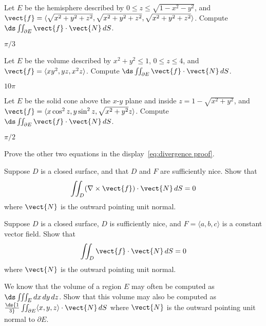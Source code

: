 \begin{enumialphparenastyle}
\begin{ex}
Let $E$ be the hemisphere described by 
$0\le z\le \sqrt{1-x^2-y^2}$, and 
$\vect{f}= \langle \sqrt{x^2+y^2+z^2},\sqrt{x^2+y^2+z^2},
\sqrt{x^2+y^2+z^2}\rangle$. Compute
$\ds\iint_{\partial E} \vect{f}\cdot \vect{N}\,dS$.
\begin{sol}
	$\pi/3$
\end{sol}
\end{ex}

\begin{ex}
Let $E$ be the volume described by 
$x^2+y^2\le1$, $0\le z\le4$, and 
$\vect{f}= \langle xy^2,yz,x^2z\rangle$. Compute
$\ds\iint_{\partial E} \vect{f}\cdot \vect{N}\,dS$.
\begin{sol}
	$10\pi$
\end{sol}
\end{ex}

\begin{ex}
Let $E$ be the solid cone above the $x$-$y$ plane and
inside $z=1-\sqrt{x^2+y^2}$, and 
$\vect{f}= \langle x\cos^2 z,y\sin^2z,\sqrt{x^2+y^2}z\rangle$. Compute
$\ds\iint_{\partial E} \vect{f}\cdot \vect{N}\,dS$.
\begin{sol}
	$\pi/2$
\end{sol}
\end{ex}

\begin{ex}
Prove the other two equations in the 
display~\ref{eq:divergence proof}.
\end{ex}

\begin{ex}
Suppose $D$ is a closed surface, and that $D$ and $F$ are
sufficiently nice. Show that 
$$\iint_{D} (\nabla \times \vect{f}) \cdot \vect{N}\, dS = 0$$
where $\vect{N}$ is the outward pointing unit normal.
\end{ex}

\begin{ex}
Suppose $D$ is a closed surface, $D$ is sufficiently nice,
and $F=\langle a,b,c\rangle$ is a constant vector field.
Show that 
$$\iint_{D} \vect{f} \cdot \vect{N}\, dS = 0$$
where $\vect{N}$ is the outward pointing unit normal.
\end{ex}

\begin{ex}
We know that the volume of a region $E$ may often be computed as
$\ds \iiint_{E}dx\,dy\,dz$. Show that this volume may also be computed as
$\ds{1\over3} \iint_{\partial E} \langle x,y,z\rangle \cdot \vect{N}\,dS$
where $\vect{N}$ is the outward pointing unit normal to $\partial E$.
\end{ex}

\end{enumialphparenastyle}
